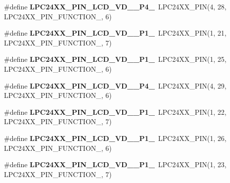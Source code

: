 \begin{DoxyCompactItemize}
\item 
\mbox{\label{group__lpc24xx__io_gab0aa1b8c11e4dcbdbd6e499a5b8de92f}} 
\#define {\bfseries L\+P\+C24\+X\+X\+\_\+\+P\+I\+N\+\_\+\+L\+C\+D\+\_\+\+V\+D\+\_\+\_\+\+P4\+\_}~L\+P\+C24\+X\+X\+\_\+\+P\+IN(4, 28, L\+P\+C24\+X\+X\+\_\+\+P\+I\+N\+\_\+\+F\+U\+N\+C\+T\+I\+O\+N\+\_, 6)
\item 
\mbox{\label{group__lpc24xx__io_ga035efd1c6db0a5302de717f9752cafe4}} 
\#define {\bfseries L\+P\+C24\+X\+X\+\_\+\+P\+I\+N\+\_\+\+L\+C\+D\+\_\+\+V\+D\+\_\+\_\+\+P1\+\_}~L\+P\+C24\+X\+X\+\_\+\+P\+IN(1, 21, L\+P\+C24\+X\+X\+\_\+\+P\+I\+N\+\_\+\+F\+U\+N\+C\+T\+I\+O\+N\+\_, 7)
\item 
\mbox{\label{group__lpc24xx__io_ga96545f62a53ec789be3c8b6bcd0c808d}} 
\#define {\bfseries L\+P\+C24\+X\+X\+\_\+\+P\+I\+N\+\_\+\+L\+C\+D\+\_\+\+V\+D\+\_\+\_\+\+P1\+\_}~L\+P\+C24\+X\+X\+\_\+\+P\+IN(1, 25, L\+P\+C24\+X\+X\+\_\+\+P\+I\+N\+\_\+\+F\+U\+N\+C\+T\+I\+O\+N\+\_, 6)
\item 
\mbox{\label{group__lpc24xx__io_gaeb66ec82bd5b90789a4485393d411f13}} 
\#define {\bfseries L\+P\+C24\+X\+X\+\_\+\+P\+I\+N\+\_\+\+L\+C\+D\+\_\+\+V\+D\+\_\+\_\+\+P4\+\_}~L\+P\+C24\+X\+X\+\_\+\+P\+IN(4, 29, L\+P\+C24\+X\+X\+\_\+\+P\+I\+N\+\_\+\+F\+U\+N\+C\+T\+I\+O\+N\+\_, 6)
\item 
\mbox{\label{group__lpc24xx__io_ga684ee0df08492eba105f89e92dd4de92}} 
\#define {\bfseries L\+P\+C24\+X\+X\+\_\+\+P\+I\+N\+\_\+\+L\+C\+D\+\_\+\+V\+D\+\_\+\_\+\+P1\+\_}~L\+P\+C24\+X\+X\+\_\+\+P\+IN(1, 22, L\+P\+C24\+X\+X\+\_\+\+P\+I\+N\+\_\+\+F\+U\+N\+C\+T\+I\+O\+N\+\_, 7)
\item 
\mbox{\label{group__lpc24xx__io_gad302ae0c29c4cf902c6eb8346aaa5e02}} 
\#define {\bfseries L\+P\+C24\+X\+X\+\_\+\+P\+I\+N\+\_\+\+L\+C\+D\+\_\+\+V\+D\+\_\+\_\+\+P1\+\_}~L\+P\+C24\+X\+X\+\_\+\+P\+IN(1, 26, L\+P\+C24\+X\+X\+\_\+\+P\+I\+N\+\_\+\+F\+U\+N\+C\+T\+I\+O\+N\+\_, 6)
\item 
\mbox{\label{group__lpc24xx__io_ga5e43a03e6cc96fea5f9180ddf298cf9c}} 
\#define {\bfseries L\+P\+C24\+X\+X\+\_\+\+P\+I\+N\+\_\+\+L\+C\+D\+\_\+\+V\+D\+\_\+\_\+\+P1\+\_}~L\+P\+C24\+X\+X\+\_\+\+P\+IN(1, 23, L\+P\+C24\+X\+X\+\_\+\+P\+I\+N\+\_\+\+F\+U\+N\+C\+T\+I\+O\+N\+\_, 7)

\end{DoxyCompactItemize}
